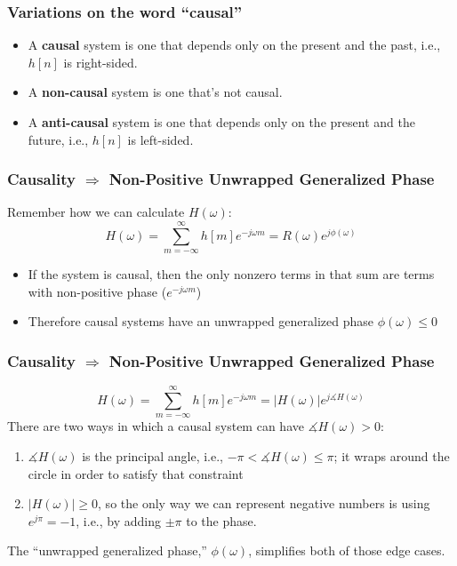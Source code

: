 \documentclass{beamer}
\begin{document}
\begin{frame}
  \frametitle{Variations on the word ``causal''}

  \begin{itemize}
  \item A {\bf causal} system is one that depends only on the present
    and the past, i.e., $h[n]$ is right-sided.
  \item A {\bf non-causal} system is one that's not causal.
  \item A {\bf anti-causal} system is one that depends only on the
    present and the future, i.e., $h[n]$ is left-sided.
  \end{itemize}
\end{frame}

\begin{frame}
  \frametitle{Causality $\Rightarrow$ Non-Positive Unwrapped Generalized Phase}

  Remember how we can calculate $H(\omega)$:
  \begin{displaymath}
    H(\omega) = \sum_{m=-\infty}^\infty h[m] e^{-j\omega m}=R(\omega)e^{j\phi(\omega)}
  \end{displaymath}
  \begin{itemize}
  \item If the system is causal, then the only nonzero terms in that sum are terms with
    non-positive phase ($e^{-j\omega m}$)
  \item Therefore causal systems have an unwrapped generalized phase $\phi(\omega)\le 0$
  \end{itemize}
\end{frame}

\begin{frame}
  \frametitle{Causality $\Rightarrow$ Non-Positive Unwrapped Generalized Phase}

  \begin{displaymath}
    H(\omega) = \sum_{m=-\infty}^\infty h[m] e^{-j\omega m} = |H(\omega)|e^{j\measuredangle H(\omega)}
  \end{displaymath}
  There are two ways in which a causal system can have $\measuredangle H(\omega)>0$:
  \begin{enumerate}
  \item $\measuredangle H(\omega)$ is the principal angle, i.e., $-\pi<\measuredangle H(\omega)\le\pi$;
    it wraps around the circle in order to satisfy that constraint
  \item $|H(\omega)|\ge 0$, so the only way we can represent negative numbers is using
    $e^{j\pi}=-1$, i.e., by adding $\pm\pi$ to the phase.
  \end{enumerate}
  The ``unwrapped generalized phase,'' $\phi(\omega)$, simplifies both of those edge cases.
\end{frame}
\end{document}
